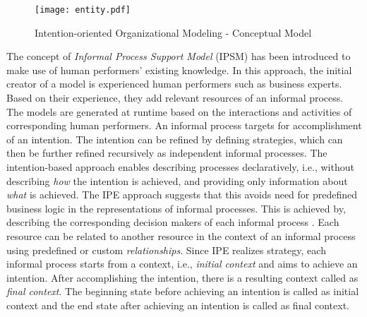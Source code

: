 \begin{figure}
	\centering
	\texttt{[image: entity.pdf]}
	\caption{Intention-oriented Organizational Modeling - Conceptual Model}
	\label{fig:entitymodel}
\end{figure}

The concept of \textit{Informal Process Support Model} (IPSM) \cite{Sungur2014a} has been introduced to make use of human performers' existing knowledge. In this approach, the initial creator of a model is experienced human performers such as business experts. Based on their experience, they add relevant resources of an informal process. The models are generated at runtime based on the interactions and activities of corresponding human performers. An informal process targets for accomplishment of an intention. The intention can be refined by defining strategies, which can then be further refined recursively as independent informal processes. The intention-based approach enables describing processes declaratively, i.e., without describing \textit{how} the intention is achieved, and providing only information about \textit{what} is achieved. The IPE approach suggests that this avoids need for predefined business logic in the representations of informal processes. This is achieved by, describing the corresponding decision makers of each informal process \cite{Sungur2014a}. Each resource can be related to another resource in the context of an informal process using predefined or custom \textit{relationships}. Since IPE realizes strategy, each informal process starts from a context, i.e., \textit{initial context} and aims to achieve an intention. After accomplishing the intention, there is a resulting context called as \textit{final context}. The beginning state before achieving an intention is called as initial context and the end state after achieving an intention is called as final context.

